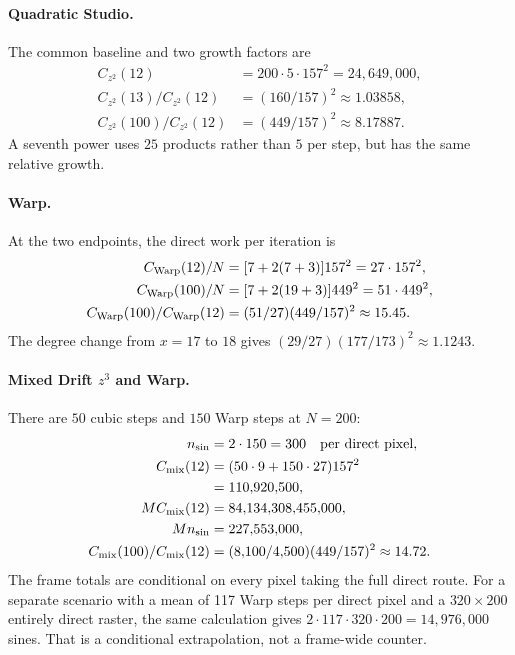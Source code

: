 \documentclass[11pt,a4paper]{article}
\numberwithin{equation}{section}
\begin{document}
\paragraph{Quadratic Studio.}
The common baseline and two growth factors are
\begin{align*}
  C_{z^2}(12)&=200\cdot5\cdot157^2=24{,}649{,}000,\\
  C_{z^2}(13)/C_{z^2}(12)&=(160/157)^2\approx1.03858,\\
  C_{z^2}(100)/C_{z^2}(12)&=(449/157)^2\approx8.17887.
\end{align*}
A seventh power uses \(25\) products rather than \(5\) per step, but
has the same relative growth.

\paragraph{Warp.}
At the two endpoints, the direct work per iteration is
\begin{align*}
  C_{\rm Warp}(12)/N&=[7+2(7+3)]157^2=27\cdot157^2,\\
  C_{\rm Warp}(100)/N&=[7+2(19+3)]449^2=51\cdot449^2,\\
  C_{\rm Warp}(100)/C_{\rm Warp}(12)
    &=(51/27)(449/157)^2\approx15.45 .
\end{align*}
The degree change from \(x=17\) to \(18\) gives
\((29/27)(177/173)^2\approx1.1243\).

\paragraph{Mixed Drift \(z^3\) and Warp.}
There are \(50\) cubic steps and \(150\) Warp steps at \(N=200\):
\begin{align*}
  n_{\sin}&=2\cdot150=300\quad\text{per direct pixel},\\
  C_{\rm mix}(12)&=(50\cdot9+150\cdot27)157^2\\
    &=110{,}920{,}500,\\
  M C_{\rm mix}(12)&=84{,}134{,}308{,}455{,}000,\\
  M n_{\sin}&=227{,}553{,}000,\\
  C_{\rm mix}(100)/C_{\rm mix}(12)
    &=(8{,}100/4{,}500)(449/157)^2\approx14.72 .
\end{align*}
The frame totals are conditional on every pixel taking the full direct
route. For a separate scenario with a mean of 117 Warp steps per
direct pixel and a \(320\times200\) entirely direct raster, the same
calculation gives \(2\cdot117\cdot320\cdot200=14{,}976{,}000\) sines.
That is a conditional extrapolation, not a frame-wide counter.
\end{document}
